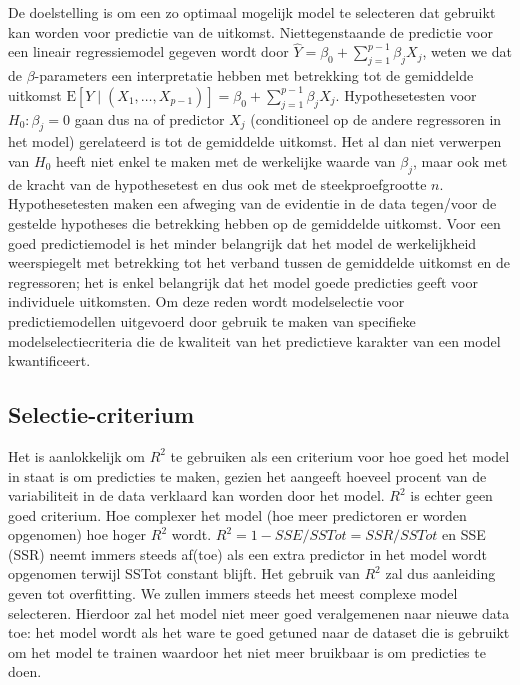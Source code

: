 \documentclass[
  dutch,
  letterpaper,
  12pt]{book}
\theoremstyle{definition}
\theoremstyle{definition}
\theoremstyle{definition}
\theoremstyle{remark}
\begin{document}
De doelstelling is om een zo optimaal mogelijk model te selecteren dat
gebruikt kan worden voor predictie van de uitkomst. Niettegenstaande de
predictie voor een lineair regressiemodel gegeven wordt door
\(\hat{Y}=\beta_0+\sum_{j=1}^{p-1}\beta_jX_j\), weten we dat de
\(\beta\)-parameters een interpretatie hebben met betrekking tot de
gemiddelde uitkomst
\(\text{E}[Y\mid (X_1,\ldots,X_{p-1})]=\beta_0+\sum_{j=1}^{p-1}\beta_jX_j\).
Hypothesetesten voor \(H_0:\beta_j=0\) gaan dus na of predictor \(X_j\)
(conditioneel op de andere regressoren in het model) gerelateerd is tot
de gemiddelde uitkomst. Het al dan niet verwerpen van \(H_0\) heeft niet
enkel te maken met de werkelijke waarde van \(\beta_j\), maar ook met de
kracht van de hypothesetest en dus ook met de steekproefgrootte \(n\).
Hypothesetesten maken een afweging van de evidentie in de data
tegen/voor de gestelde hypotheses die betrekking hebben op de gemiddelde
uitkomst. Voor een goed predictiemodel is het minder belangrijk dat het
model de werkelijkheid weerspiegelt met betrekking tot het verband
tussen de gemiddelde uitkomst en de regressoren; het is enkel belangrijk
dat het model goede predicties geeft voor individuele uitkomsten. Om
deze reden wordt modelselectie voor predictiemodellen uitgevoerd door
gebruik te maken van specifieke modelselectiecriteria die de kwaliteit
van het predictieve karakter van een model kwantificeert.

\subsection{Selectie-criterium}\label{selectie-criterium}

Het is aanlokkelijk om \(R^2\) te gebruiken als een criterium voor hoe
goed het model in staat is om predicties te maken, gezien het aangeeft
hoeveel procent van de variabiliteit in de data verklaard kan worden
door het model. \(R^2\) is echter geen goed criterium. Hoe complexer het
model (hoe meer predictoren er worden opgenomen) hoe hoger \(R^2\)
wordt. \(R^2 = 1-SSE/SSTot = SSR/SSTot\) en SSE (SSR) neemt immers
steeds af(toe) als een extra predictor in het model wordt opgenomen
terwijl SSTot constant blijft. Het gebruik van \(R^2\) zal dus
aanleiding geven tot overfitting. We zullen immers steeds het meest
complexe model selecteren. Hierdoor zal het model niet meer goed
veralgemenen naar nieuwe data toe: het model wordt als het ware te goed
getuned naar de dataset die is gebruikt om het model te trainen waardoor
het niet meer bruikbaar is om predicties te doen.
\end{document}
